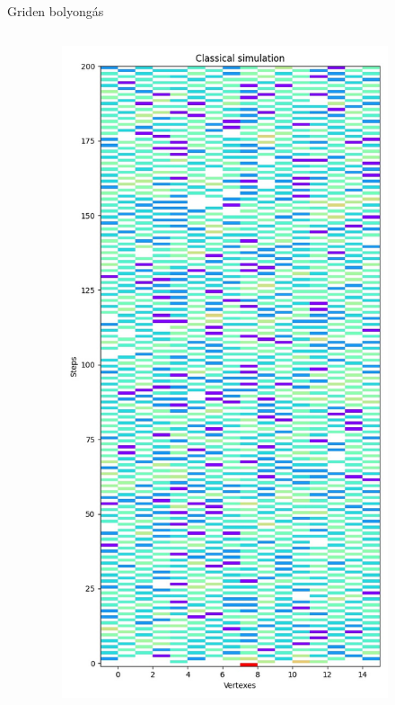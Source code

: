 \documentclass[aspectratio=169]{beamer}
\begin{document}
\begin{frame}{Griden bolyongás}

  \begin{columns}[onlytextwidth]
    \begin{column}{.25\textwidth}
    \end{column}
    \begin{column}{.25\textwidth}
      \begin{figure}
        \includegraphics[width=0.9\textwidth]{./tdk_figures/results/grid/classical.jpg}

\end{figure}
\end{column}
\end{columns}
\end{frame}
\end{document}
